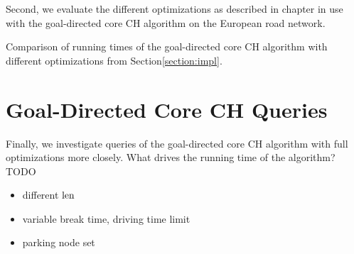 Second, we evaluate the different optimizations as described in chapter  in use with the goal-directed core CH algorithm on the European road network.

\begin{table}[hbtp]
	\centering
	
	\caption{Comparison of running times of the goal-directed core CH algorithm with different optimizations from Section\ref{section:impl}.}
	\label{tbl:opt_runtime}
\end{table}

\section{Goal-Directed Core CH Queries}
Finally, we investigate queries of the goal-directed core CH algorithm with full optimizations more closely. What drives the running time of the algorithm? TODO


\begin{itemize}
	\item different $\operatorname{len}$
	\item variable break time, driving time limit
	\item parking node set
\end{itemize}
